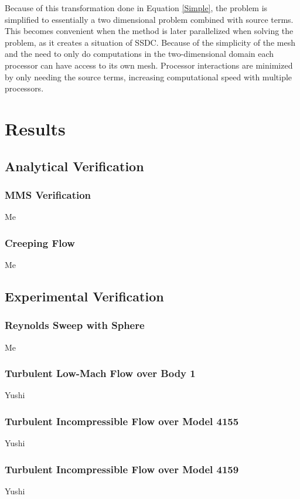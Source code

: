 \documentclass[draft]{aiaa-pretty}
\begin{document}
 Because of this transformation done in Equation \ref{Simple}, the problem is simplified to essentially a two dimensional problem combined with source terms.  This becomes 
 convenient when the method is later parallelized when solving the problem, as it creates a situation of SSDC.  Because of the simplicity of the mesh and the need to only 
 do computations in the two-dimensional domain each processor can have access to its own mesh. Processor interactions are minimized by only needing the source terms, 
 increasing computational speed with multiple processors.
 


\section{Results}

\subsection{Analytical Verification}
\subsubsection{MMS Verification}
Me
\subsubsection{Creeping Flow}
Me

\subsection{Experimental Verification}
\subsubsection{Reynolds Sweep with Sphere}
Me
\subsubsection{Turbulent Low-Mach Flow over Body 1}
Yushi
\subsubsection{Turbulent Incompressible Flow over Model 4155}
Yushi
\subsubsection{Turbulent Incompressible Flow over Model 4159}
Yushi
\end{document}
